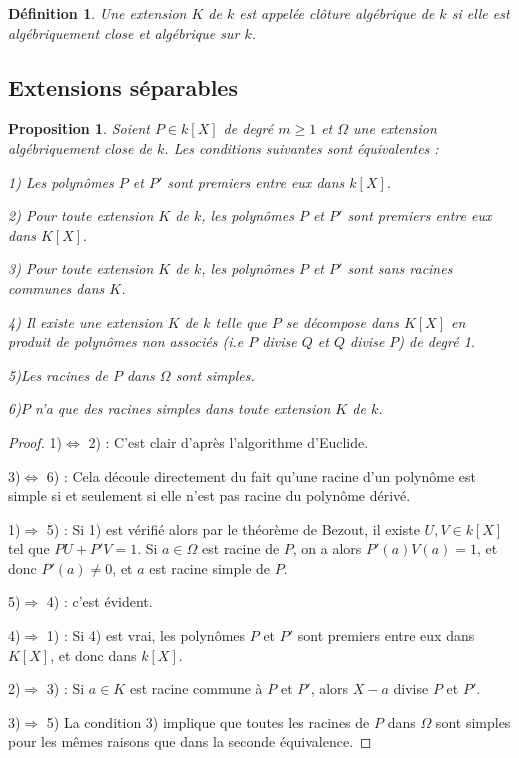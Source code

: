 \documentclass[12pt,a4paper]{report}
\newtheorem{prop}[thm]{\bf Proposition}
\newtheorem{defn}[thm]{\bf D\'efinition}
\begin{document}
\begin{defn}\rm
Une extension $K$ de $k$ est appelée clôture algébrique de $k$ si elle est algébriquement close et algébrique sur $k$.

\end{defn}

\subsection{Extensions séparables}
\begin{prop}\rm
Soient $P\in k[X]$ de degré $m\geq 1$ et $\Omega$ une extension algébriquement close de $k$. Les conditions suivantes sont équivalentes : 

1) Les polynômes $P$ et $P'$ sont premiers entre eux dans $k[X]$.

2) Pour toute extension $K$ de $k$, les polynômes $P$ et $P'$ sont premiers entre eux dans $K[X].$

3) Pour toute extension $K$ de $k$, les polynômes $P$ et $P'$ sont sans racines communes dans $K$.

4) Il existe une extension $K$ de $k$ telle que $P$ se décompose dans $K[X]$ en produit de polynômes non associés (i.e $P$ divise $Q$ et $Q$ divise $P$) de degré 1.

5)Les racines de $P$ dans $\Omega$ sont simples.

6)$P$ n'a que des racines simples dans toute extension $K$ de $k$.

\end{prop}

\begin{proof}

1)$\Leftrightarrow$ 2) : C'est clair d'après l'algorithme d'Euclide. 

3)$\Leftrightarrow$ 6) : Cela découle directement du fait qu'une racine d'un polynôme est simple si et seulement si elle n'est pas racine du polynôme dérivé. 

1)$\Rightarrow$ 5) : Si 1) est vérifié alors par le théorème de Bezout, il existe $U,V\in k[X]$ tel que $PU+P'V=1$. Si $a \in \Omega$ est racine de $P$, on a alors $P'(a)V(a)=1$, et donc $P'(a)\neq 0$, et $a$ est racine simple de $P$.

5)$\Rightarrow$ 4) : c'est évident. 

4)$\Rightarrow$ 1) : Si 4) est vrai, les polynômes $P$ et $P'$ sont premiers entre eux dans $K[X]$, et donc dans $k[X]$.

2)$\Rightarrow$ 3) : Si $a \in K$ est racine commune à $P$ et $P'$, alors $X-a$ divise $P$ et $P'$. 

3)$\Rightarrow$ 5) La condition 3) implique que toutes les racines de $P$ dans $\Omega$ sont simples pour les mêmes raisons que dans la seconde équivalence. 

\end{proof}
\end{document}

